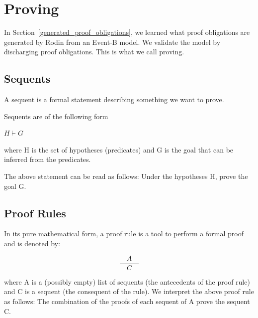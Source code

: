 \section{Proving}
\label{proving}

In Section~\ref{generated_proof_obligations}, we learned what proof obligations are generated by Rodin from an Event-B model.  We validate the model by discharging proof obligations.  This is what we call proving.


\subsection{Sequents}
\label{sequents}

A sequent is a formal statement describing something we want to prove.

Sequents are of the following form 

$H \vdash G$

where H is the set of hypotheses (predicates) and G is the goal that can be inferred from the predicates.

The above statement can be read as follows: Under the hypotheses H, prove the goal G. 

\subsection{Proof Rules}
\label{proof_rules}

In its pure mathematical form, a proof rule is a tool to perform a formal proof and is denoted by: 

$$\frac{\quad A\quad}{C}$$

where A is a (possibly empty) list of sequents (the antecedents of the proof rule) and C is a sequent (the consequent of the rule). We interpret the above proof rule as follows: The combination of the proofs of each sequent of A prove the sequent C. 

